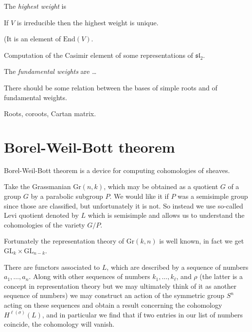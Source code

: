 The {\it highest weight} is 

\begin{exercise}
\label{exercise-if-V-is-irreducible-then-highest-weight-is-unique}
If $V$ is irreducible then the highest weight is unique.
\end{exercise}

\begin{definition}
\label{definition-Casimir-element}
(It is an element of $\text{End}(V)$.
\end{definition}

Computation of the Casimir element of some representations of $\mathfrak{sl}_2$.

The {\it fundamental weights} are …

There should be some relation between the bases of simple roots and of
fundamental weights.

\begin{exercise}
\label{exercise-}
Roots, coroots, Cartan matrix.
\end{exercise}

\section{Borel-Weil-Bott theorem}
\label{section-Borel-Weil-Bott-thoerem}

Borel-Weil-Bott theorem is a device for computing cohomologies of sheaves.

Take the Grassmanian $\text{Gr}(n,k)$, which may be obtained as a quotient $G$
of a group $G$ by a parabolic subgroup $P$. We would like it if $P$ was a
semisimple group since those are classified, but unfortunately it is not. 
So instead we use so-called Levi quotient denoted by $L$ which is semisimple
and allows us to understand the cohomologies of the variety $G/P$.

Fortunately the representation theory of $\text{Gr}(k,n)$ is well known, in fact
we get $\text{GL}_k \times \text{GL}_{n-k}$.

There are functors associated to $L$, which are described by a sequence of
numbers $a_1,\ldots,a_n$. Along with other sequences of numbers
$k_1,\ldots,k_\ell$, and $\rho$ (the latter is a concept in representation
theory but we may ultimately think of it as another sequence of numbers) we may
construct an action of the symmetric group $S^n$ acting on these sequences and
obtain a result concerning the cohomology $H^{\ell(\sigma)}(L)$, and in
particular we find that if two entries in our list of numbers coincide, the
cohomology will vanish.







